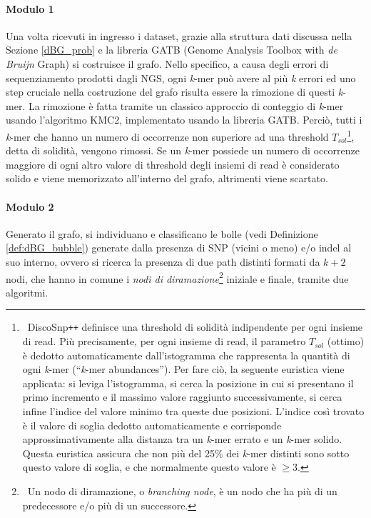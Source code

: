 \documentclass[../main.tex]{subfiles}
\begin{document}
\paragraph{Modulo 1} Una volta ricevuti in ingresso i dataset, grazie alla struttura dati discussa nella Sezione \ref{dBG_prob} e la libreria GATB (Genome Analysis Toolbox with \textit{de Bruijn} Graph) si costruisce il grafo. Nello specifico, a causa degli errori di sequenziamento prodotti dagli NGS, ogni \textit{k}-mer può avere al più \textit{k} errori ed uno step cruciale nella costruzione del grafo risulta essere la rimozione di questi \textit{k}-mer. La rimozione è fatta tramite un classico approccio di conteggio di \textit{k}-mer usando l'algoritmo KMC2, implementato usando la libreria GATB. Perciò, tutti i \textit{k}-mer che hanno un numero di occorrenze non superiore ad una threshold $T_{sol}$\footnote{\ DiscoSnp\texttt{++} definisce una threshold di solidità indipendente per ogni insieme di read. Più precisamente, per ogni insieme di read, il parametro $T_{sol}$ (ottimo) è dedotto automaticamente dall'istogramma che rappresenta la quantità di ogni \textit{k}-mer (``\textit{k}-mer abundances''). Per fare ciò, la seguente euristica viene applicata: si leviga l'istogramma, si cerca la posizione in cui si presentano il primo incremento e il massimo valore raggiunto successivamente, si cerca infine l'indice del valore minimo tra queste due posizioni. L'indice così trovato è il valore di soglia dedotto automaticamente e corrisponde approssimativamente alla distanza tra un \textit{k}-mer errato e un \textit{k}-mer solido. Questa euristica assicura che non più del 25\% dei \textit{k}-mer distinti sono sotto questo valore di soglia, e che normalmente questo valore è $\geq3$.}, detta di solidità, vengono rimossi. Se  un \textit{k}-mer possiede un numero di occorrenze maggiore di ogni altro valore di threshold degli insiemi di read è considerato solido e viene memorizzato all'interno del grafo, altrimenti viene scartato.

\paragraph{Modulo 2} Generato il grafo, si individuano e classificano le bolle (vedi Definizione \ref{def:dBG_bubble}) generate dalla presenza di SNP (vicini o meno) e/o indel al suo interno, ovvero si ricerca la presenza di due path distinti formati da $k+2$ nodi, che hanno in comune i \textit{nodi di diramazione}\footnote{\ Un nodo di diramazione, o \textit{branching node}, è un nodo che ha più di un predecessore e/o più di un successore.} iniziale e finale, tramite due algoritmi.
\end{document}
